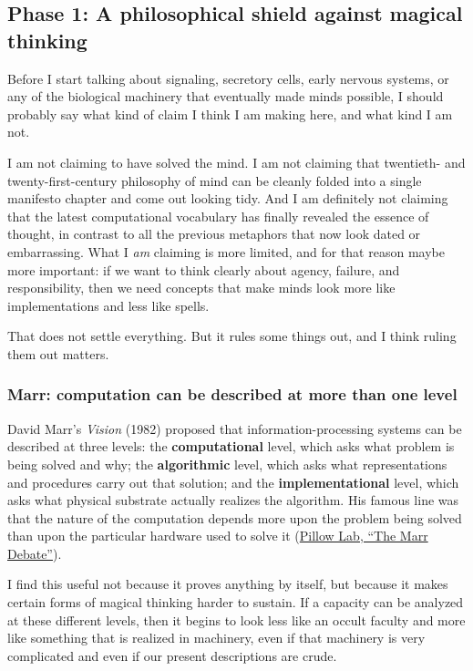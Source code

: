 ﻿\subsection{Phase 1: A philosophical shield against magical thinking}\label{03_it_started-phase-1-a-philosophical-shield-against-magical-thinking}

Before I start talking about signaling, secretory cells, early nervous systems, or any of the biological machinery that eventually made minds possible, I should probably say what kind of claim I think I am making here, and what kind I am not.

I am not claiming to have solved the mind. I am not claiming that twentieth- and twenty-first-century philosophy of mind can be cleanly folded into a single manifesto chapter and come out looking tidy. And I am definitely not claiming that the latest computational vocabulary has finally revealed the essence of thought, in contrast to all the previous metaphors that now look dated or embarrassing. What I \emph{am} claiming is more limited, and for that reason maybe more important: if we want to think clearly about agency, failure, and responsibility, then we need concepts that make minds look more like implementations and less like spells.

That does not settle everything. But it rules some things out, and I think ruling them out matters.

\subsubsection{Marr: computation can be described at more than one level}\label{03_it_started-marr-computation-can-be-described-at-more-than-one-level}

David Marr's \emph{Vision} (1982) proposed that information-processing systems can be described at three levels: the \textbf{computational} level, which asks what problem is being solved and why; the \textbf{algorithmic} level, which asks what representations and procedures carry out that solution; and the \textbf{implementational} level, which asks what physical substrate actually realizes the algorithm. His famous line was that the nature of the computation depends more upon the problem being solved than upon the particular hardware used to solve it (\href{https://pillowlab.princeton.edu/pubs/Pillow2024_MarrDebate.pdf}{Pillow Lab, ``The Marr Debate''}).

I find this useful not because it proves anything by itself, but because it makes certain forms of magical thinking harder to sustain. If a capacity can be analyzed at these different levels, then it begins to look less like an occult faculty and more like something that is realized in machinery, even if that machinery is very complicated and even if our present descriptions are crude.

